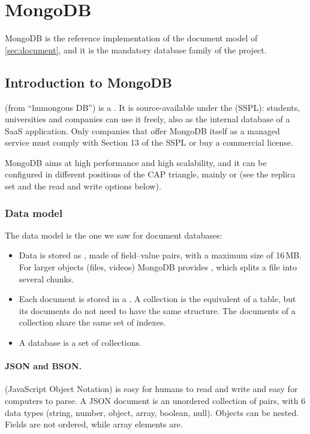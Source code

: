 \section{MongoDB}\label{sec:mongodb}

MongoDB is the reference implementation of the document model of \cref{sec:document}, and it is the mandatory database family of the project.



\subsection{Introduction to MongoDB}

 (from ``humongous DB'') is a . It is source-available under the  (SSPL): students, universities and companies can use it freely, also as the internal database of a SaaS application. Only companies that offer MongoDB itself as a managed service must comply with Section 13 of the SSPL or buy a commercial license.

MongoDB aims at high performance and high scalability, and it can be configured in different positions of the CAP triangle, mainly  or  (see the replica set and the read and write options below).

\subsubsection{Data model}

The data model is the one we saw for document databases:
\begin{itemize}
  \item Data is stored as , made of field--value pairs, with a maximum size of 16\,MB. For larger objects (files, videos) MongoDB provides , which splits a file into several chunks.
  \item Each document is stored in a . A collection is the equivalent of a table, but its documents do not need to have the same structure. The documents of a collection share the same set of indexes.
  \item A database is a set of collections.
\end{itemize}

\paragraph{JSON and BSON.}  (JavaScript Object Notation) is easy for humans to read and write and easy for computers to parse. A JSON document is an unordered collection of  pairs, with 6 data types (string, number, object, array, boolean, null). Objects can be nested. Fields are not ordered, while array elements are.

